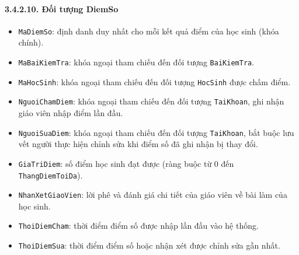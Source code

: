\documentclass[12pt,a4paper]{article}
\begin{document}
\paragraph{3.4.2.10. Đối tượng DiemSo}\mbox{}
\begin{itemize}\setlength{\itemsep}{2pt}\setlength{\parskip}{0pt}
    \item \texttt{MaDiemSo}: định danh duy nhất cho mỗi kết quả điểm của học sinh (khóa chính).
    \item \texttt{MaBaiKiemTra}: khóa ngoại tham chiếu đến đối tượng \texttt{BaiKiemTra}.
    \item \texttt{MaHocSinh}: khóa ngoại tham chiếu đến đối tượng \texttt{HocSinh} được chấm điểm.
    \item \texttt{NguoiChamDiem}: khóa ngoại tham chiếu đến đối tượng \texttt{TaiKhoan}, ghi nhận giáo viên nhập điểm lần đầu.
    \item \texttt{NguoiSuaDiem}: khóa ngoại tham chiếu đến đối tượng \texttt{TaiKhoan}, bắt buộc lưu vết người thực hiện chỉnh sửa khi điểm số đã ghi nhận bị thay đổi.
    \item \texttt{GiaTriDiem}: số điểm học sinh đạt được (ràng buộc từ 0 đến \texttt{ThangDiemToiDa}).
    \item \texttt{NhanXetGiaoVien}: lời phê và đánh giá chi tiết của giáo viên về bài làm của học sinh.
    \item \texttt{ThoiDiemCham}: thời điểm điểm số được nhập lần đầu vào hệ thống.
    \item \texttt{ThoiDiemSua}: thời điểm điểm số hoặc nhận xét được chỉnh sửa gần nhất.
\end{itemize}
\end{document}
